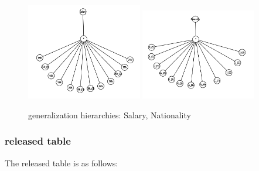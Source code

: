 \documentclass[a4paper,12pt]{article}
\begin{document}
\newpage

\begin{figure}[ht]
    \centering
    \includegraphics[width=0.45\textwidth]{assets/6.png}
    \hfill
    \includegraphics[width=0.45\textwidth]{assets/5.png}
    \caption{generalization hierarchies: Salary, Nationality}
\end{figure}

\subsubsection{released table}
The released table is as follows:
\end{document}
